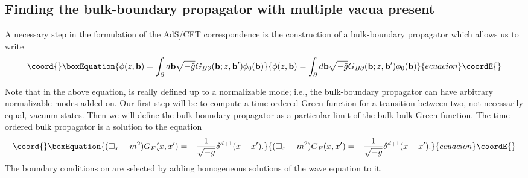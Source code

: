 \documentclass[a4paper,aps,prd,preprintnumbers,groupedaddress]{revtex4}
\begin{document}
\subsection{Finding the bulk-boundary propagator with multiple vacua present} \label{bulk-boundary}
A necessary step in the formulation of the AdS/CFT correspondence is the construction of a bulk-boundary propagator \coordHE{} which allows us to write
\begin{equation}\coord{}\boxEquation{ \label{bulk boundary gives phi}
\phi(z,{\bf b}) = \int _\partial d{\bf b} \sqrt{-\tilde{g}} G_{B\partial}({\bf b};z,{\bf b'}) \phi_0 ({\bf b})
}{ \phi(z,{\bf b}) = \int _\partial d{\bf b} \sqrt{-\tilde{g}} G_{B\partial}({\bf b};z,{\bf b'}) \phi_0 ({\bf b})
}{ecuacion}\coordE{}\end{equation}

Note that in the above equation, \myHighlight{$\phi$}\coordHE{} is really defined up to a normalizable mode; i.e.,
the bulk-boundary propagator can have arbitrary normalizable modes added on.  Our first step will be to compute a time-ordered Green function for a transition between two, not necessarily equal, vacuum states. Then we will define the bulk-boundary propagator as a particular limit of the bulk-bulk Green function. The time-ordered bulk propagator is a solution to the
equation
\begin{equation}\coord{}\boxEquation{ \label{feynman diffeq}
(\Box _x - m^2) G_F(x,x') = -\frac{1}{\sqrt{-g}} \delta^{d+1}(x-x') .
}{ (\Box _x - m^2) G_F(x,x') = -\frac{1}{\sqrt{-g}} \delta^{d+1}(x-x') .
}{ecuacion}\coordE{}\end{equation}
The boundary conditions on \coordHE{} are selected by adding homogeneous solutions of the wave equation to it.
\end{document}
